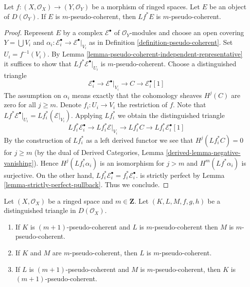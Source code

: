 \begin{lemma}
\label{lemma-pseudo-coherent-pullback}
Let $f : (X, \mathcal{O}_X) \to (Y, \mathcal{O}_Y)$
be a morphism of ringed spaces. Let $E$ be an object of
$D(\mathcal{O}_Y)$. If $E$ is $m$-pseudo-coherent,
then $Lf^*E$ is $m$-pseudo-coherent.
\end{lemma}

\begin{proof}
Represent $E$ by a complex $\mathcal{E}^\bullet$ of $\mathcal{O}_Y$-modules
and choose an open covering $Y = \bigcup V_i$ and
$\alpha_i : \mathcal{E}_i^\bullet \to \mathcal{E}^\bullet|_{V_i}$
as in Definition \ref{definition-pseudo-coherent}.
Set $U_i = f^{-1}(V_i)$.
By Lemma \ref{lemma-pseudo-coherent-independent-representative}
it suffices to show that $Lf^*\mathcal{E}^\bullet|_{U_i}$ is
$m$-pseudo-coherent.
Choose a distinguished triangle
$$
\mathcal{E}_i^\bullet \to
\mathcal{E}^\bullet|_{V_i} \to
C \to
\mathcal{E}_i^\bullet[1]
$$
The assumption on $\alpha_i$ means exactly that the cohomology sheaves
$H^j(C)$ are zero for all $j \geq m$. Denote $f_i : U_i \to V_i$
the restriction of $f$. Note that $Lf^*\mathcal{E}^\bullet|_{U_i} =
Lf_i^*(\mathcal{E}|_{V_i})$. Applying $Lf_i^*$ we obtain
the distinguished triangle
$$
Lf_i^*\mathcal{E}_i^\bullet \to
Lf_i^*\mathcal{E}|_{V_i} \to
Lf_i^*C \to
Lf_i^*\mathcal{E}_i^\bullet[1]
$$
By the construction of $Lf_i^*$ as a left derived functor we see that
$H^j(Lf_i^*C) = 0$ for $j \geq m$ (by the dual of Derived Categories, Lemma
\ref{derived-lemma-negative-vanishing}). Hence $H^j(Lf_i^*\alpha_i)$ is an
isomorphism for $j > m$ and $H^m(Lf^*\alpha_i)$ is surjective.
On the other hand,
$Lf_i^*\mathcal{E}_i^\bullet = f_i^*\mathcal{E}_i^\bullet$.
is strictly perfect by Lemma \ref{lemma-strictly-perfect-pullback}.
Thus we conclude.
\end{proof}

\begin{lemma}
\label{lemma-cone-pseudo-coherent}
Let $(X, \mathcal{O}_X)$ be a ringed space and $m \in \mathbf{Z}$.
Let $(K, L, M, f, g, h)$ be a distinguished triangle in $D(\mathcal{O}_X)$.
\begin{enumerate}
\item If $K$ is $(m + 1)$-pseudo-coherent and $L$ is $m$-pseudo-coherent
then $M$ is $m$-pseudo-coherent.
\item If $K$ and $M$ are $m$-pseudo-coherent, then $L$ is $m$-pseudo-coherent.
\item If $L$ is $(m + 1)$-pseudo-coherent and $M$
is $m$-pseudo-coherent, then $K$ is $(m + 1)$-pseudo-coherent.
\end{enumerate}
\end{lemma}

